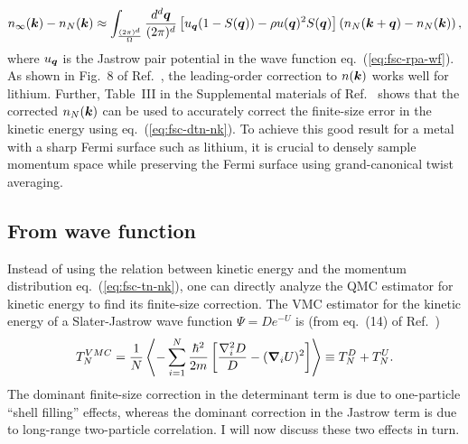 \begin{align} \label{eq:fsc-dnk-lo}
n_{\infty}(\boldsymbol{k}) - n_N(\boldsymbol{k}) \approx \int_{\frac{(2\pi)^d}{\Omega}}
\dfrac{d^d\boldsymbol{q}}{(2\pi)^d}
\left[
u_{\boldsymbol{q}}(1-S(\boldsymbol{q}))-\rho u(\boldsymbol{q})^2S(\boldsymbol{q})
\right]
\left(
n_N(\boldsymbol{k}+\boldsymbol{q})-n_N(\boldsymbol{k})
\right),
\end{align}
where $u_{\boldsymbol{q}}$ is the Jastrow pair potential in the wave function eq.~(\ref{eq:fsc-rpa-wf}).
As shown in Fig.~8 of Ref.~\cite{Yang2020-licp}, the leading-order correction to $n(\boldsymbol{k})$ works well for lithium. Further, Table~III in the Supplemental materials of Ref.~\cite{Yang2020-licp} shows that the corrected $n_N(\boldsymbol{k})$ can be used to accurately correct the finite-size error in the kinetic energy using eq.~(\ref{eq:fsc-dtn-nk}). To achieve this good result for a metal with a sharp Fermi surface such as lithium, it is crucial to densely sample momentum space while preserving the Fermi surface using grand-canonical twist averaging.

\subsection{From wave function}
Instead of using the relation between kinetic energy and the momentum distribution eq.~(\ref{eq:fsc-tn-nk}), one can directly analyze the QMC estimator for kinetic energy to find its finite-size correction. The VMC estimator for the kinetic energy of a Slater-Jastrow wave function $\Psi=De^{-U}$ is (from eq.~(14) of Ref.~\cite{Holzmann2016})
\begin{align} \label{eq:fsc-tn-vmc}
T_N^{VMC} = \frac{1}{N}\left\langle
-\sum\limits_{i=1}^N \dfrac{\hbar^2}{2m}\left[
\dfrac{\nabla_i^2D}{D} - (\boldsymbol{\nabla}_i U)^2
\right]
\right\rangle\equiv T_N^D + T_N^U.
\end{align}
The dominant finite-size correction in the determinant term is due to one-particle ``shell filling'' effects, whereas the dominant correction in the Jastrow term is due to long-range two-particle correlation. I will now discuss these two effects in turn.
